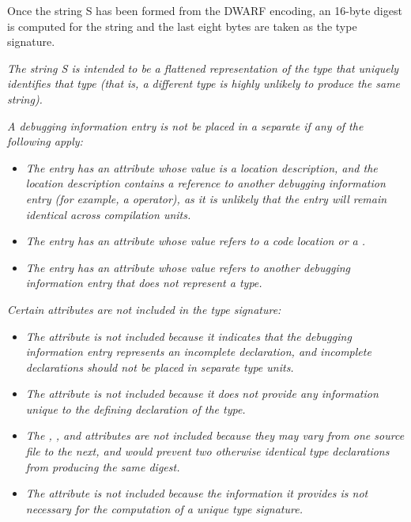 Once the string S has been formed from the DWARF encoding,
an 16-byte \MDfive{} digest is computed for the string and the 
last eight bytes are taken as the type signature.

\textit{The string S is intended to be a flattened representation of
the type that uniquely identifies that type (that is, a different
type is highly unlikely to produce the same string).}

\textit{A debugging information entry is not be placed in a
separate 
if any of the following apply:}

\begin{itemize}

\item \textit{The entry has an attribute whose value is a location
description, and the location description 
contains a reference to
another debugging information entry (for example, a \DWOPcallref{}
operator), as it is unlikely that the entry will remain
identical across compilation units.}

\item \textit{The entry has an attribute whose value refers
to a code location or a .}

\item \textit{The entry has an attribute whose value refers
to another debugging information entry that does not represent
a type.}
\end{itemize}


\textit{Certain attributes are not included in the type signature:}

\begin{itemize}
\item \textit{The \DWATdeclaration{} attribute is not included because it
indicates that the debugging information entry represents an
incomplete declaration, and incomplete declarations should
not be placed in 
separate type units.}

\item \textit{The \DWATdescription{} attribute is not included because
it does not provide any information unique to the defining
declaration of the type.}

\item \textit{The \DWATdeclfile, 
\DWATdeclline, and
\DWATdeclcolumn{} attributes are not included because they
may vary from one source file to the next, and would prevent
two otherwise identical type declarations from producing the
same \MDfive{} digest.}

\item \textit{The \DWATobjectpointer{} attribute is not included 
because the information it provides is not necessary for the 
computation of a unique type signature.}

\end{itemize}

